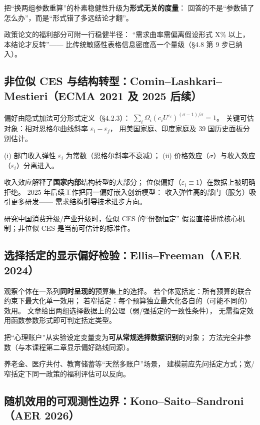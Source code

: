 把“换两组参数重算”的朴素稳健性升级为\textbf{形式无关的度量}：
回答的不是“参数错了怎么办”，而是“形式错了多远结论才翻”。

政策论文的福利部分可附一行稳健半径：
“需求曲率需偏离假设形式 X\% 以上，本结论才反转”——
比传统敏感性表格信息密度高一个量级（§4.8 第 9 步已纳入）。

\subsection{非位似 CES 与结构转型：Comin--Lashkari--Mestieri（ECMA 2021 及 2025 后续）}

偏好由隐式加法可分形式定义（§4.2.3）：
$\sum_i\Omega_i(c_iU^{\varepsilon_i})^{(\sigma-1)/\sigma}=1$。
关键可估对象：相对恩格尔曲线斜率 $\varepsilon_i-\varepsilon_j$，
用美国家庭、印度家庭及 39 国历史面板分别估计。

(i) 部门收入弹性 $\varepsilon_i$ 为常数（恩格尔斜率不衰减）；
(ii) 价格效应（$\sigma$）与收入效应（$\varepsilon_i$）分离进入。

收入效应解释了\textbf{国家内部}结构转型的大部分；
位似偏好（$\varepsilon_i\equiv1$）在数据上被明确拒绝。
2025 年后续工作把同一偏好嵌入创新模型：
收入弹性高的部门（服务）吸引更多研发——
需求结构\textbf{引导}技术进步方向。

研究中国消费升级/产业升级时，位似 CES 的“份额恒定”
假设直接排除核心机制；非位似 CES 是当前可估计的标准件。

\subsection{选择括定的显示偏好检验：Ellis--Freeman（AER 2024）}

观察个体在一系列\textbf{同时呈现的}预算集上的选择。
若个体宽括定：所有预算的联合约束下最大化单一效用；
若窄括定：每个预算独立最大化各自的（可能不同的）效用。
文章给出两组选择数据上的公理（弱/强括定的一致性条件），
无需指定效用函数参数形式即可判定括定类型。

把“心理账户”从实验设定变量变为\textbf{可从常规选择数据识别}的对象；
方法完全非参数（与本课程第二章显示偏好路线同源）。

养老金、医疗共付、教育储蓄等“天然多账户”场景，
建模前应先问括定方式；宽/窄括定下同一政策的福利评估可以反向。

\subsection{随机效用的可观测性边界：Kono--Saito--Sandroni（AER 2026）}

